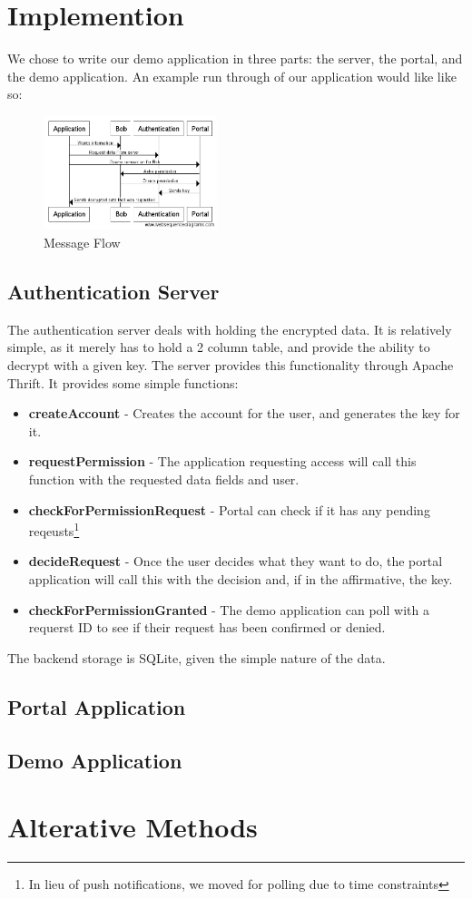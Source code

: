 \documentclass[letterpaper,twocolumn,10pt]{article}
\begin{document}
\section{Implemention}
    We chose to write our demo application in three parts: the server, the portal, and the demo application. An example run through of our application would like like so:
\begin{figure}[ht]
\includegraphics[width=0.45\textwidth]{messageDiagram}
\caption{Message Flow}
\end{figure}

\subsection{Authentication Server}
    The authentication server deals with holding the encrypted data. It is relatively simple, as it merely has to hold a 2 column table, and provide the ability to decrypt with a given key. The server provides this functionality through Apache Thrift\cite{thrift}. It provides some simple functions:
    \begin{itemize}
        \item \textbf{createAccount} - Creates the account for the user, and generates the key for it.
        \item \textbf{requestPermission} - The application requesting access will call this function with the requested data fields and user.
        \item \textbf{checkForPermissionRequest} - Portal can check if it has any pending reqeusts\footnote{In lieu of push notifications, we moved for polling due to time constraints} 
        \item \textbf{decideRequest} - Once the user decides what they want to do, the portal application will call this with the decision and, if in the affirmative, the key.
        \item \textbf{checkForPermissionGranted} - The demo application can poll with a requerst ID to see if their request has been confirmed or denied.
    \end{itemize}

The backend storage is SQLite, given the simple nature of the data.
\subsection{Portal Application}
\subsection{Demo Application}

\section{Alterative Methods}


{
    \small
    
    
}
\end{document}
